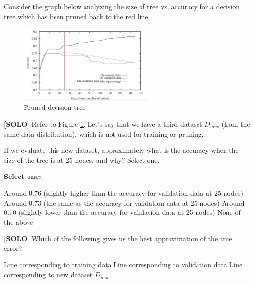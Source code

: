 \documentclass[11pt,addpoints,answers]{exam}
\begin{document}
\begin{questions}
\begin{parts}
    
    \end{parts}
    
    \clearpage
    Consider the graph below analyzing the size of tree vs. accuracy for a decision tree which has been pruned back to the red line. 
 

\begin{figure}[H]
  \centering
  \includegraphics[width = 0.6\textwidth]{images/dtree.png}
  \caption{Pruned decision tree \label{fig:dtree}}
\end{figure}
      

   \question[1] \textbf{[SOLO]} Refer to Figure \ref{fig:dtree}. Let's say that we have a third dataset $D_{new}$ (from the same data distribution), which is not used for training or pruning. 
    
    If we evaluate this new dataset, approximately what is the accuracy when the size of the tree is at 25 nodes, and why? Select one. 
    
    
    \textbf{Select one:}
    \begin{checkboxes}
        \choice Around 0.76 (slightly higher than the accuracy for validation data at 25 nodes)
        \choice Around 0.73 (the same as the accuracy for validation data at 25 nodes)
        \CorrectChoice Around 0.70 (slightly lower than the accuracy for  validation data at 25 nodes)
        \choice None of the above
    \end{checkboxes}
    
    
    
    
      \question[1] \textbf{[SOLO]} Which of the following gives us the best approximation of the true error? 
   
    
    
 \begin{checkboxes}
        \choice Line corresponding to training data 
        \choice Line corresponding to validation data 
        \CorrectChoice Line corresponding to new dataset $D_{new}$ 
    \end{checkboxes}
    

\end{questions}
\end{document}
